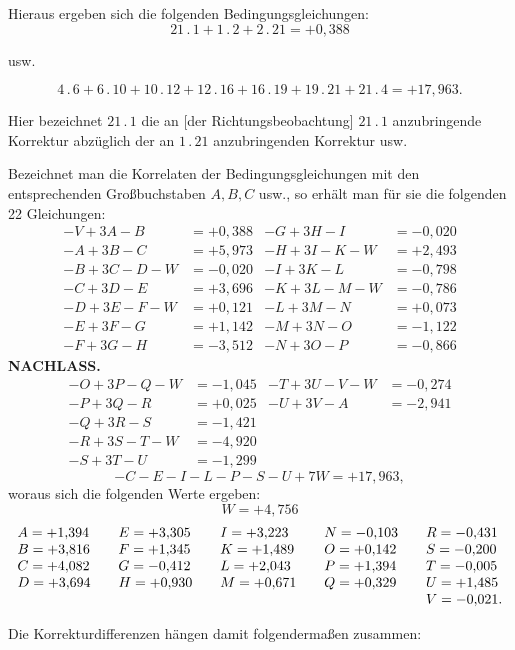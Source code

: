 \par\noindent\hspace*{\parindent}Hieraus ergeben sich die folgenden Bedingungsgleichungen:
\[
21\, .\,1+1\, .\,2+2\, .\,21=+0{,}388
\]
\begin{center}usw.\end{center}
\[
4\, .\,6+6\, .\,10+10\, .\,12+12\, .\,16+16\, .\,19+19\, .\,21+21\, .\,4=+17{,}963.
\]
\par\noindent\hspace*{\parindent}Hier bezeichnet \(21\, .\,1\) die an [der Richtungsbeobachtung] \(21\, .\,1\)
anzubringende Korrektur abzüglich der an \(1\, .\,21\) anzubringenden Korrektur usw.

\par\noindent\hspace*{\parindent}Bezeichnet man die Korrelaten der Bedingungsgleichungen mit den entsprechenden
Großbuchstaben \(A,B,C\) usw., so erhält man für sie die folgenden
22 Gleichungen:
\[
\begin{aligned}
-V+3A-B&=+0{,}388 & -G+3H-I&=-0{,}020\\
-A+3B-C&=+5{,}973 & -H+3I-K-W&=+2{,}493\\
-B+3C-D-W&=-0{,}020 & -I+3K-L&=-0{,}798\\
-C+3D-E&=+3{,}696 & -K+3L-M-W&=-0{,}786\\
-D+3E-F-W&=+0{,}121 & -L+3M-N&=+0{,}073\\
-E+3F-G&=+1{,}142 & -M+3N-O&=-1{,}122\\
-F+3G-H&=-3{,}512 & -N+3O-P&=-0{,}866
\end{aligned}
\]
\clearpage
{}\hfill\textbf{NACHLASS.}
\[
\begin{aligned}
-O+3P-Q-W&=-1{,}045 & -T+3U-V-W&=-0{,}274\\
-P+3Q-R&=+0{,}025 & -U+3V-A&=-2{,}941\\
-Q+3R-S&=-1{,}421\\
-R+3S-T-W&=-4{,}920\\
-S+3T-U&=-1{,}299
\end{aligned}
\]
\[
-C-E-I-L-P-S-U+7W=+17{,}963,
\]
\noindent woraus sich die folgenden Werte ergeben:
\[
W=+4{,}756
\]
\[
\begin{array}{l@{\qquad}l@{\qquad}l@{\qquad}l@{\qquad}l}
A=+1{,}394&E=+3{,}305&I=+3{,}223&N=-0{,}103&R=-0{,}431\\
B=+3{,}816&F=+1{,}345&K=+1{,}489&O=+0{,}142&S=-0{,}200\\
C=+4{,}082&G=-0{,}412&L=+2{,}043&P=+1{,}394&T=-0{,}005\\
D=+3{,}694&H=+0{,}930&M=+0{,}671&Q=+0{,}329&U=+1{,}485\\
&&&&V=-0{,}021.
\end{array}
\]
\par\noindent\hspace*{\parindent}Die Korrekturdifferenzen hängen damit folgendermaßen zusammen:

